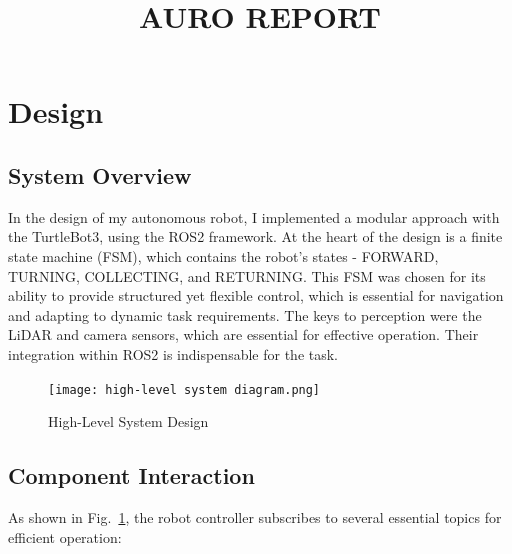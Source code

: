 \documentclass[conference]{IEEEtran}
\begin{document}
\title{AURO REPORT}
\author{}

\maketitle


\section{Design}
\subsection{System Overview}
In the design of my autonomous robot, I implemented a modular approach with the TurtleBot3, using the ROS2 framework. At the heart of the design is a finite state machine (FSM), which contains the robot's states - FORWARD, TURNING, COLLECTING, and RETURNING. This FSM was chosen for its ability to provide structured yet flexible control, which is essential for navigation and adapting to dynamic task requirements. The keys to perception were the LiDAR and camera sensors, which are essential for effective operation. Their integration within ROS2 is indispensable for the task.

\begin{figure}[htbp]
\centerline{\texttt{[image: high-level system diagram.png]}}
\caption{High-Level System Design}
\label{fig:systemdesign}
\end{figure}

\subsection{Component Interaction}
As shown in Fig.~\ref{fig:systemdesign}, the robot controller subscribes to several essential topics for efficient operation:
\end{document}
